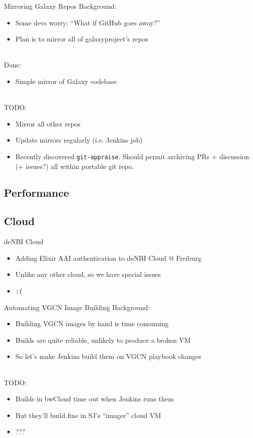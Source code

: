 \documentclass[12pt]{ufrslides}
\begin{document}
	\begin{frame}{Mirroring Galaxy Repos}
		Background:
		\begin{itemize}
			\item Some devs worry: ``What if GitHub goes away?''
			\item Plan is to mirror all of galaxyproject's repos
		\end{itemize}
		\ \\[0.5cm]
		Done:
		\begin{itemize}
			\item Simple mirror of Galaxy codebase
		\end{itemize}
		\ \\[0.5cm]
		TODO:
		\begin{itemize}
			\item Mirror all other repos
			\item Update mirrors regularly (i.e. Jenkins job)
			\item Recently discovered \texttt{git-appraise}. Should permit archiving PRs + discussion (+ issues?) all within portable git repo.
		\end{itemize}
	\end{frame}

\subsection{Performance}
\subsection{Cloud}

	\begin{frame}{deNBI Cloud}
		\begin{itemize}
			\item Adding Elixir AAI authentication to deNBI Cloud @ Freiburg
			\item Unlike any other cloud, so we have special issues
			\item \texttt{:(}
		\end{itemize}
	\end{frame}

	\begin{frame}{Automating VGCN Image Building}
		Background:
		\begin{itemize}
			\item Building VGCN images by hand is time consuming
			\item Builds are quite reliable, unlikely to produce a broken VM
			\item So let's make Jenkins build them on VGCN playbook changes
		\end{itemize}
		\ \\[0.5cm]
		TODO:
		\begin{itemize}
			\item Builds in bwCloud time out when Jenkins runs them
			\item But they'll build fine in SJ's ``imager'' cloud VM
			\item ???
		\end{itemize}
	\end{frame}
\end{document}

